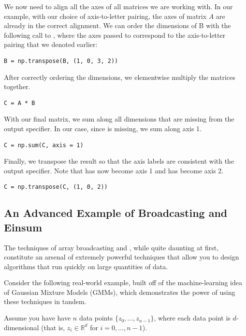 We now need to align all the axes of all matrices we are working with.
In our example, with our choice of axis-to-letter pairing, the axes of matrix $A$ are already in the correct alignment.
We can order the dimensions of B with the following call to , where the axes passed to  correspond to the axis-to-letter pairing that we denoted earlier:

\begin{lstlisting}
B = np.transpose(B, (1, 0, 3, 2))
\end{lstlisting}

After correctly ordering the dimensions, we elementwise multiply the matrices together.

\begin{lstlisting}
C = A * B
\end{lstlisting}

With our final matrix, we sum along all dimensions that are missing from the output specifier. In our case, since  is missing, we sum along axis 1.

\begin{lstlisting}
C = np.sum(C, axis = 1)
\end{lstlisting}

Finally, we  transpose the result so that the axis labels are consistent with the output specifier. Note that  has now become axis 1 and  has become axis 2.

\begin{lstlisting}
C = np.transpose(C, (1, 0, 2))
\end{lstlisting}


\subsection*{An Advanced Example of Broadcasting and Einsum} %
The techniques of array broadcasting and , while quite daunting at first, constitute an arsenal of extremely powerful techniques that allow you to design algorithms that run quickly on large quantities of data.

Consider the following real-world example, built off of the machine-learning idea of Gaussian Mixture Models (GMMs), which demonstrates the power of using these techniques in tandem.

Assume you have have $n$ data points $\{z_0, \ldots, z_{n-1}\}$, where each data point is $d$-dimensional (that is, $z_i \in \mathbb{R}^d$ for $i = 0, \ldots, n-1$).

